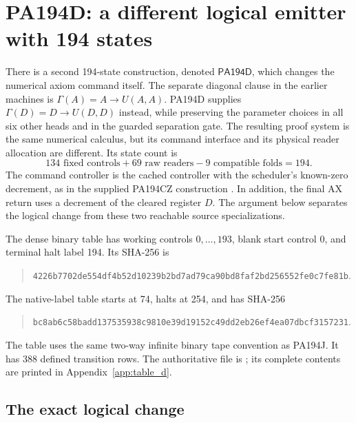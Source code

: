 \section{PA194D: a different logical emitter with 194 states}
\label{sec:gammad}

There is a second 194-state construction, denoted
\(\mathsf{PA194D}\), which changes the numerical axiom command itself.
The separate diagonal clause in the earlier machines is
\(\Gamma(A)=A\to U(A,A)\).  PA194D supplies
\(\Gamma(D)=D\to U(D,D)\) instead, while preserving the parameter
choices in all six other heads and in the guarded separation gate.
The resulting proof system is the same numerical calculus, but its
command interface and its physical reader allocation are different.
Its state count is
\[
 134\text{ fixed controls}+69\text{ raw readers}
       -9\text{ compatible folds}=194.
\]
The command controller is the cached controller with the scheduler's
known-zero decrement, as in the supplied PA194CZ construction
\cite{cached,cz}.  In addition, the final AX return uses a decrement of
the cleared register \(D\).  The argument below separates the logical
change from these two reachable source specializations.

The dense binary table has working controls \(0,\ldots,193\), blank
start control 0, and terminal halt label 194.  Its SHA-256 is
\begin{quote}\small
\nolinkurl{4226b7702de554df4b52d10239b2bd7ad79ca90bd8faf2bd256552fe0c7fe81b}.
\end{quote}
The native-label table starts at 74, halts at 254, and has SHA-256
\begin{quote}\small
\nolinkurl{bc8ab6c58badd137535938c9810e39d19152c49dd2eb26ef4ea07dbcf3157231}.
\end{quote}
The table uses the same two-way infinite binary tape convention as
PA194J. It has 388 defined transition rows. The authoritative file is
; its complete contents are printed
in Appendix~\ref{app:table_d}.

\subsection{The exact logical change}

